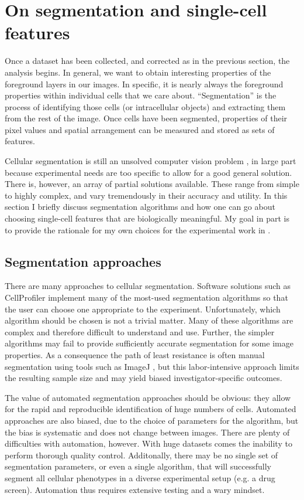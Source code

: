 \section{On segmentation and single-cell features}
\label{imaging:features}


Once a dataset has been collected, and corrected as
in the previous section, the analysis begins. In general,
we want to obtain interesting properties of the foreground
layers in our images. In specific, it is nearly always the
foreground properties within individual cells that we care
about. ``Segmentation'' is the process of identifying
those cells (or intracellular objects)
and extracting them from the rest of the image.
Once cells have been segmented, properties of their pixel
values and spatial arrangement can be measured and stored
as sets of features.


Cellular segmentation is still an unsolved computer
vision problem \cite{Danuser2011},
in large part because experimental needs are too specific
to allow for a good general solution. There is, however,
an array of partial solutions available. These range from simple
to highly complex, and vary tremendously in their accuracy
and utility.
In this section I briefly discuss segmentation algorithms
and how one can go about choosing single-cell
features that are biologically meaningful.
My goal in part is to provide
the rationale for my own choices for the
experimental work in .


\subsection{Segmentation approaches}
\label{imaging:segmentation}

There are many approaches to cellular segmentation.
Software solutions such as CellProfiler \cite{Carpenter2006}
implement many of the most-used segmentation algorithms
so that the user can choose one appropriate to the experiment.
Unfortunately, which algorithm should be chosen is not a trivial matter.
Many of these algorithms are complex and therefore difficult
to understand and use. Further, the simpler algorithms may fail
to provide sufficiently accurate segmentation for some image properties.
As a consequence the path of least resistance is often manual segmentation
using tools such as ImageJ \cite{Schneider2012},
but this labor-intensive approach limits the resulting sample
size and may yield biased investigator-specific outcomes.


The value of automated segmentation approaches should be obvious:
they allow for the rapid and reproducible
identification of huge numbers of cells. Automated approaches are
also biased, due to the choice of parameters for the algorithm, but
the bias is systematic and does not change between images.
There are plenty of difficulties with automation, however. With
huge datasets comes the inability to perform thorough quality
control. Additonally, there may be no single set of segmentation parameters,
or even a single algorithm, that will successfully segment all
cellular phenotypes in a diverse experimental setup (e.g. a
drug screen). Automation thus requires extensive testing and
a wary mindset.


